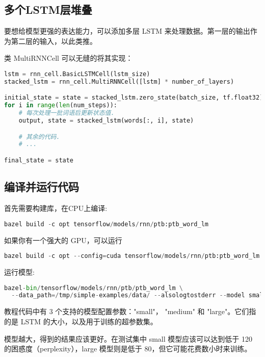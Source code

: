 \subsection{多个LSTM层堆叠}
要想给模型更强的表达能力，可以添加多层 LSTM 来处理数据。第一层的输出作为第二层的输入，以此类推。

类 MultiRNNCell 可以无缝的将其实现：
\begin{lstlisting}[language=Python]
lstm = rnn_cell.BasicLSTMCell(lstm_size)
stacked_lstm = rnn_cell.MultiRNNCell([lstm] * number_of_layers)

initial_state = state = stacked_lstm.zero_state(batch_size, tf.float32)
for i in range(len(num_steps)):
    # 每次处理一批词语后更新状态值.
    output, state = stacked_lstm(words[:, i], state)

    # 其余的代码.
    # ...

final_state = state
\end{lstlisting}
\subsection{编译并运行代码}
首先需要构建库，在CPU上编译:
\begin{lstlisting}[language=Python]
bazel build -c opt tensorflow/models/rnn/ptb:ptb_word_lm
\end{lstlisting}
如果你有一个强大的 GPU，可以运行
\begin{lstlisting}[language=Python]
bazel build -c opt --config=cuda tensorflow/models/rnn/ptb:ptb_word_lm
\end{lstlisting}
运行模型:
\begin{lstlisting}[language=Python]
bazel-bin/tensorflow/models/rnn/ptb/ptb_word_lm \
  --data_path=/tmp/simple-examples/data/ --alsologtostderr --model small
\end{lstlisting}
教程代码中有 3 个支持的模型配置参数："small"， "medium" 和 "large"。它们指的是 LSTM 的大小，以及用于训练的超参数集。

模型越大，得到的结果应该更好。在测试集中 small 模型应该可以达到低于 120 的困惑度（perplexity），large 模型则是低于 80，但它可能花费数小时来训练。

